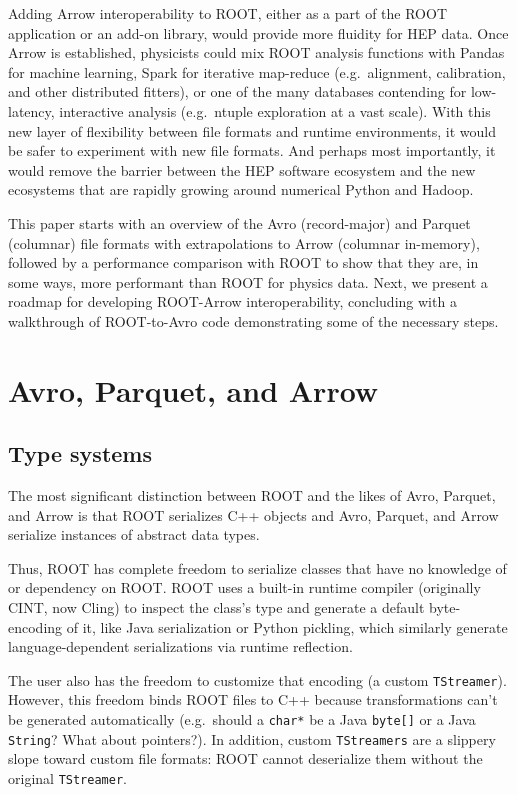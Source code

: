 \documentclass{article}
\begin{document}
Adding Arrow interoperability to ROOT, either as a part of the ROOT application or an add-on library, would provide more fluidity for HEP data. Once Arrow is established, physicists could mix ROOT analysis functions with Pandas for machine learning, Spark for iterative map-reduce (e.g.\ alignment, calibration, and other distributed fitters), or one of the many databases contending for low-latency, interactive analysis (e.g.\ ntuple exploration at a vast scale). With this new layer of flexibility between file formats and runtime environments, it would be safer to experiment with new file formats. And perhaps most importantly, it would remove the barrier between the HEP software ecosystem and the new ecosystems that are rapidly growing around numerical Python and Hadoop.

This paper starts with an overview of the Avro (record-major) and Parquet (columnar) file formats with extrapolations to Arrow (columnar in-memory), followed by a performance comparison with ROOT to show that they are, in some ways, more performant than ROOT for physics data. Next, we present a roadmap for developing ROOT-Arrow interoperability, concluding with a walkthrough of ROOT-to-Avro code demonstrating some of the necessary steps.

\section*{Avro, Parquet, and Arrow}

\subsection*{Type systems}

The most significant distinction between ROOT and the likes of Avro, Parquet, and Arrow is that ROOT serializes C++ objects and Avro, Parquet, and Arrow serialize instances of abstract data types.

Thus, ROOT has complete freedom to serialize classes that have no knowledge of or dependency on ROOT. ROOT uses a built-in runtime compiler (originally CINT, now Cling) to inspect the class's type and generate a default byte-encoding of it, like Java serialization or Python pickling, which similarly generate language-dependent serializations via runtime reflection.

The user also has the freedom to customize that encoding (a custom {\tt TStreamer}). However, this freedom binds ROOT files to C++ because transformations can't be generated automatically (e.g.\ should a {\tt char*} be a Java {\tt byte[]} or a Java {\tt String}? What about pointers?). In addition, custom {\tt TStreamers} are a slippery slope toward custom file formats: ROOT cannot deserialize them without the original {\tt TStreamer}.
\end{document}
